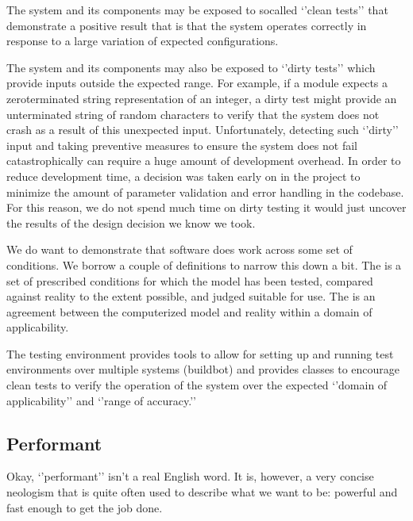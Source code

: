 \documentclass[letterpaper,10pt,english]{sphinxmanual}
\begin{document}
The system and its components may be exposed to so\sphinxhyphen{}called ‘’clean tests’’ that
demonstrate a positive result \textendash{} that is that the system operates correctly in
response to a large variation of expected configurations.

The system and its components may also be exposed to ‘’dirty tests’’ which
provide inputs outside the expected range.  For example, if a module expects a
zero\sphinxhyphen{}terminated string representation of an integer, a dirty test might provide
an unterminated string of random characters to verify that the system does not
crash as a result of this unexpected input.  Unfortunately, detecting such
‘’dirty’’ input and taking preventive measures to ensure the system does not
fail catastrophically can require a huge amount of development overhead.  In
order to reduce development time, a decision was taken early on in the project
to minimize the amount of parameter validation and error handling in the
 codebase.  For this reason, we do not spend much time on dirty
testing \textendash{} it would just uncover the results of the design decision we know
we took.

We do want to demonstrate that  software does work across some set
of conditions.  We borrow a couple of definitions to narrow this down a bit.
The  is a set of prescribed conditions for which
the model has been tested, compared against reality to the extent possible, and
judged  suitable for use.  The  is an agreement between
the computerized model and reality within a domain of applicability.

The  testing environment provides tools to allow for setting up
and running test environments over multiple systems (buildbot) and provides
classes to encourage clean tests to verify the operation of the system over the
expected ‘’domain of applicability’’ and ‘’range of accuracy.’’


\subsection{Performant}
\label{\detokenize{test-background:performant}}
Okay, ‘’performant’’ isn’t a real English word.  It is, however, a very concise
neologism that is quite often used to describe what we want  to
be: powerful and fast enough to get the job done.
\end{document}
